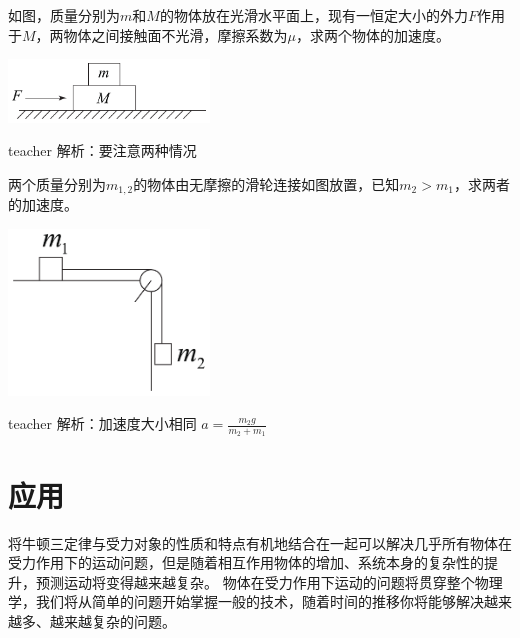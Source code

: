 \begin{example}

如图，质量分别为$m$和$M$的物体放在光滑水平面上，现有一恒定大小的外力$F$作用于$M$，两物体之间接触面不光滑，摩擦系数为$\mu$，求两个物体的加速度。
\begin{flushright}
\includegraphics[width = 0.4\textwidth]{images/newton-6.pdf} 
\end{flushright}
\begin{taggedblock}{teacher}
\noindent
解析：要注意两种情况
\end{taggedblock}
\end{example}


\begin{example}

两个质量分别为$m_{1,2}$的物体由无摩擦的滑轮连接如图放置，已知$m_2>m_1$，求两者的加速度。
\begin{flushright}
\includegraphics[width = 0.4\textwidth]{images/newton-7.pdf} 
\end{flushright}

\begin{taggedblock}{teacher}
\noindent
解析：加速度大小相同
$a=\frac{m_2g}{m_2+m_1}$
\end{taggedblock}
\end{example}

\section{应用}

将牛顿三定律与受力对象的性质和特点有机地结合在一起可以解决几乎所有物体在受力作用下的运动问题，但是随着相互作用物体的增加、系统本身的复杂性的提升，预测运动将变得越来越复杂。
物体在受力作用下运动的问题将贯穿整个物理学，我们将从简单的问题开始掌握一般的技术，随着时间的推移你将能够解决越来越多、越来越复杂的问题。


